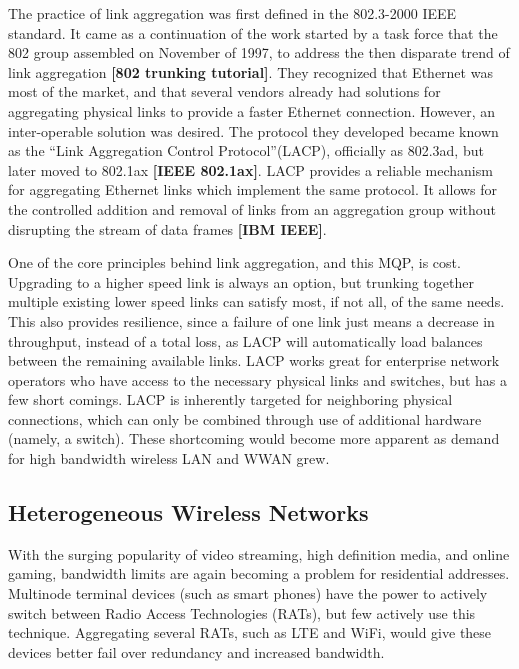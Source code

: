 \documentclass[12pt]{article}
\newcommand{\lcite}[1]
{{\bfseries\color{orange}[#1]}}
\begin{document}
	The practice of link aggregation was first defined in the 802.3-2000 IEEE standard. It came as a continuation of the work started by a task force that the 802 group assembled on November of 1997, to address the then disparate trend of link aggregation \lcite{802 trunking tutorial}. They recognized that Ethernet was most of the market, and that several vendors already had solutions for aggregating physical links to provide a faster Ethernet connection. However, an inter-operable solution was desired. The protocol they developed became known as the ``Link Aggregation Control Protocol''(LACP), officially as 802.3ad, but later moved to 802.1ax \lcite{IEEE 802.1ax}. LACP provides a reliable mechanism for aggregating Ethernet links which implement the same protocol. It allows for the controlled addition and removal of links from an aggregation group without disrupting the stream of data frames \lcite{IBM IEEE}.

	One of the core principles behind link aggregation, and this MQP, is cost. Upgrading to a higher speed link is always an option, but trunking together multiple existing lower speed links can satisfy most, if not all, of the same needs. This also provides resilience, since a failure of one link just means a decrease in throughput, instead of a total loss, as LACP will automatically load balances between the remaining available links. LACP works great for enterprise network operators who have access to the necessary physical links and switches, but has a few short comings. LACP is inherently targeted for neighboring physical connections, which can only be combined through use of additional hardware (namely, a switch). These shortcoming would become more apparent as demand for high bandwidth wireless LAN and WWAN grew.



\subsection{Heterogeneous Wireless Networks}

	With the surging popularity of video streaming, high definition media, and online gaming, bandwidth limits are again becoming a problem for residential addresses. Multinode terminal devices (such as smart phones) have the power to actively switch between Radio Access Technologies (RATs), but few actively use this technique. Aggregating several RATs, such as LTE and WiFi, would give these devices better fail over redundancy and increased bandwidth.
\end{document}
